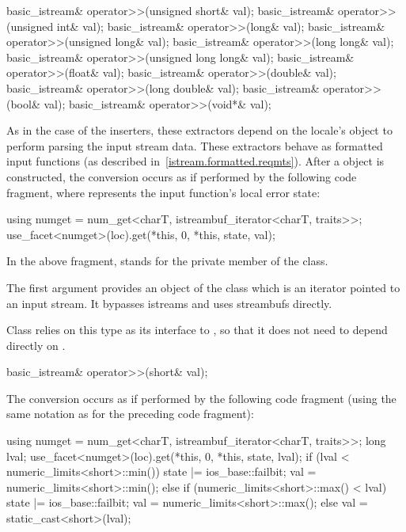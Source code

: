 %
\begin{itemdecl}
basic_istream& operator>>(unsigned short& val);
basic_istream& operator>>(unsigned int& val);
basic_istream& operator>>(long& val);
basic_istream& operator>>(unsigned long& val);
basic_istream& operator>>(long long& val);
basic_istream& operator>>(unsigned long long& val);
basic_istream& operator>>(float& val);
basic_istream& operator>>(double& val);
basic_istream& operator>>(long double& val);
basic_istream& operator>>(bool& val);
basic_istream& operator>>(void*& val);
\end{itemdecl}

\begin{itemdescr}
\pnum
As in the case of the inserters, these extractors depend on the
locale's
 object to perform parsing the input
stream data.
These extractors behave as formatted input functions (as described in~\ref{istream.formatted.reqmts}).  After a  object is constructed, the
conversion occurs as if performed by the following code fragment,
where  represents the input function's local error state:
\begin{codeblock}
using numget = num_get<charT, istreambuf_iterator<charT, traits>>;
use_facet<numget>(loc).get(*this, 0, *this, state, val);
\end{codeblock}
In the above fragment,
stands for the private member of the
class.
\begin{note}
The first argument provides an object of the
class which is an iterator pointed to an input stream.
It bypasses istreams and uses streambufs directly.
\end{note}
Class
relies on this
type as its interface to
,
so that it does not need to depend directly on
.
\end{itemdescr}

%
\begin{itemdecl}
basic_istream& operator>>(short& val);
\end{itemdecl}

\begin{itemdescr}
\pnum
The conversion occurs as if performed by the following code fragment
(using the same notation as for the preceding code fragment):
\begin{codeblock}
using numget = num_get<charT, istreambuf_iterator<charT, traits>>;
long lval;
use_facet<numget>(loc).get(*this, 0, *this, state, lval);
if (lval < numeric_limits<short>::min()) {
  state |= ios_base::failbit;
  val = numeric_limits<short>::min();
} else if (numeric_limits<short>::max() < lval) {
  state |= ios_base::failbit;
  val = numeric_limits<short>::max();
}  else
  val = static_cast<short>(lval);
\end{codeblock}
\end{itemdescr}

